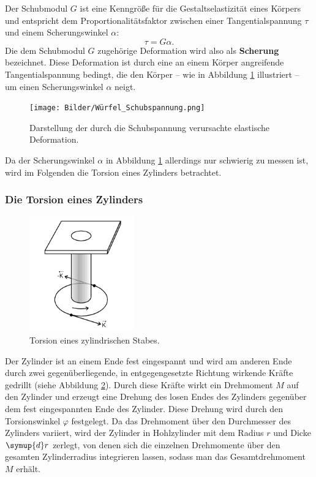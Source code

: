Der Schubmodul $G$ ist eine Kenngröße für die Gestaltselastizität eines Körpers und entspricht
dem Proportionalitätsfaktor zwischen einer Tangentialspannung $\tau$ und einem Scherungswinkel
$\alpha$:
\begin{equation}
	\label{eqn:schubimoduli}
	\tau = G \alpha \mathrm{.}
\end{equation}
Die dem Schubmodul $G$ zugehörige Deformation wird also als \textbf{Scherung} bezeichnet.
Diese Deformation ist durch eine an einem Körper angreifende Tangentialspannung bedingt, die
den Körper -- wie in Abbildung \ref{fig:würfeli} illustriert -- um einen Scherungswinkel $\alpha$
neigt.
\begin{figure}
	\centering
	\texttt{[image: Bilder/Würfel\_Schubspannung.png]}
	\caption{Darstellung der durch die Schubspannung verursachte elastische Deformation. \cite{Anleitung}}
	\label{fig:würfeli}
\end{figure}
Da der Scherungswinkel $\alpha$ in Abbildung \ref{fig:würfeli} allerdings nur schwierig zu messen
ist, wird im Folgenden die Torsion eines Zylinders betrachtet.

\subsubsection{Die Torsion eines Zylinders}
\label{sec:torsionii}
\begin{figure}
	\centering
	\includegraphics[width=0.4\textwidth]{Bilder/Torsion_Schubmodul.png}
	\caption{Torsion eines zylindrischen Stabes. \cite{Anleitung}}
	\label{fig:torsioni}
\end{figure}
Der Zylinder ist an einem Ende fest eingespannt und wird am anderen Ende durch zwei
gegenüberliegende, in entgegengesetzte Richtung wirkende Kräfte gedrillt (siehe Abbildung
\ref{fig:torsioni}).
Durch diese Kräfte wirkt ein Drehmoment $M$ auf den Zylinder und erzeugt eine Drehung des losen
Endes des Zylinders gegenüber dem fest eingespannten Ende des Zylinder. Diese Drehung wird
durch den Torsionswinkel $\varphi$ festgelegt.
Da das Drehmoment über den Durchmesser des Zylinders variiert, wird der Zylinder in Hohlzylinder
mit dem Radius $r$ und Dicke $\symup{d} r$ zerlegt, von denen sich die einzelnen Drehmomente
über den gesamten Zylinderradius integrieren lassen, sodass man das Gesamtdrehmoment $M$
erhält.

